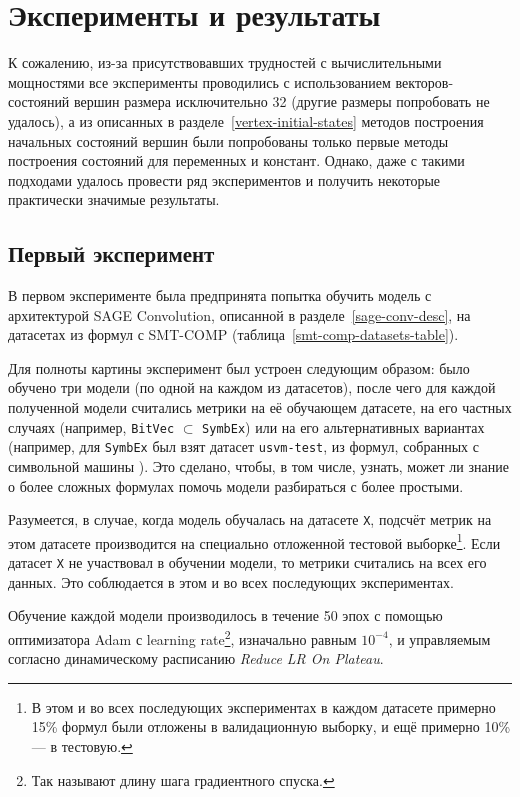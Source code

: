 \newpage

\section{Эксперименты и результаты}

К сожалению, из-за присутствовавших трудностей с вычислительными мощностями все эксперименты проводились с использованием векторов-состояний вершин размера исключительно 32 (другие размеры попробовать не удалось), а из описанных в разделе~\ref{vertex-initial-states} методов построения начальных состояний вершин были попробованы только первые методы построения состояний для переменных и констант. Однако, даже с такими подходами удалось провести ряд экспериментов и получить некоторые практически значимые результаты.

\subsection{Первый эксперимент}

В первом эксперименте была предпринята попытка обучить модель с архитектурой SAGE Convolution, описанной в разделе~\ref{sage-conv-desc}, на датасетах из формул с SMT-COMP (таблица~\ref{smt-comp-datasets-table}).

Для полноты картины эксперимент был устроен следующим образом: было обучено три модели (по одной на каждом из датасетов), после чего для каждой полученной модели считались метрики на её обучающем датасете, на его частных случаях (например, \texttt{BitVec} $\subset$ \texttt{SymbEx}) или на его альтернативных вариантах (например, для \texttt{SymbEx} был взят датасет \texttt{usvm-test}, из формул, собранных с символьной машины \cite{usvm-diploma}). Это сделано, чтобы, в том числе, узнать, может ли знание о более сложных формулах помочь модели разбираться с более простыми.

Разумеется, в случае, когда модель обучалась на датасете \texttt{X}, подсчёт метрик на этом датасете производится на специально отложенной тестовой выборке\footnote{В этом и во всех последующих экспериментах в каждом датасете примерно 15\% формул были отложены в валидационную выборку, и ещё примерно 10\% --- в тестовую.}. Если датасет \texttt{X} не участвовал в обучении модели, то метрики считались на всех его данных. Это соблюдается в этом и во всех последующих экспериментах.

Обучение каждой модели производилось в течение 50 эпох с помощью оптимизатора Adam \cite{adam-paper} с learning rate\footnote{Так называют длину шага градиентного спуска.}, изначально равным $10^{-4}$, и управляемым согласно динамическому расписанию \textit{Reduce LR On Plateau}.

